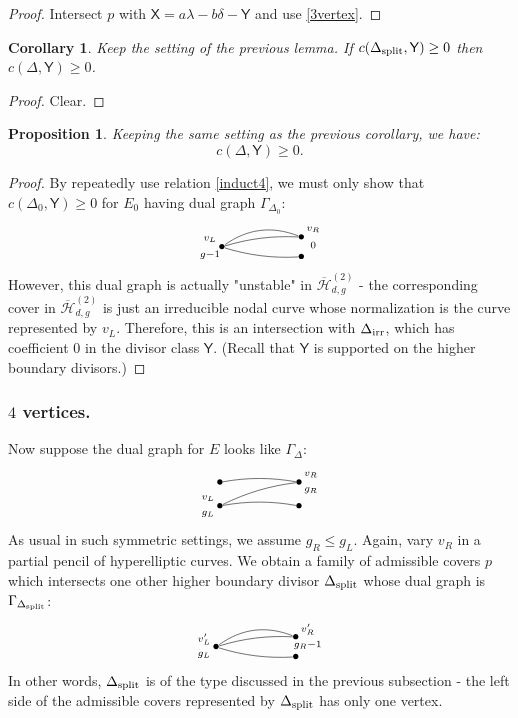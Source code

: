 \documentclass[reqno, 10 pt]{article}
\newtheorem{prop}[thm]{Proposition}
\newtheorem{cor}[thm]{Corollary}
\theoremstyle{definition}
\theoremstyle{remark}
\numberwithin{equation}{section}
\numberwithin{thm}{section}
\numberwithin{prop}{section}
\numberwithin{lem}{section}
\numberwithin{cor}{section}
\numberwithin{conj}{section}
\numberwithin{defn}{section}
\renewcommand{\H}{\mathcal H}
\newcommand{\Hdgnt}{\overline{\H}_{d,g}^{(2)}}
\newcommand{\sfY}{{\mathsf Y}}
\newcommand{\sfX}{{\mathsf X}}
\renewcommand{\H}{{\mathcal{H}}}
\newcommand {\irr}{{\rm irr}}
\newcommand {\spl}{{\rm split}}
\begin{document}
\begin{proof}
Intersect $p$ with $\sfX = a\lambda - b\delta - {\sfY}$ and use \autoref{3vertex}.
\end{proof}

\begin{cor}\label{induct4}
Keep the setting of the previous lemma.  If $ c(\Delta_{\spl}, {\sfY}) \geq 0$ then $c(\Delta ,{\sfY}) \geq 0$.
\end{cor}

\begin{proof}
Clear.
\end{proof}

\begin{prop}
Keeping the same setting as the previous corollary, we have: 
$$c(\Delta, \sfY) \geq 0.$$
\end{prop}

\begin{proof}
 By repeatedly use relation \autoref{induct4}, we must only show that $c(\Delta_0, {\sfY}) \geq 0$ for $E_0$ having dual graph $\Gamma_{\Delta_{0}}$: \[   \xygraph{
!{<0cm,0cm>;<1cm,0cm>:<0cm,1cm>::}
!{(0,-.25)}*{\bullet}="l"!{(-.3,-.45)}{\scriptstyle g-1}!{(-.3,-.05)}{\scriptstyle v_{L}}
!{(2,0) }*{\bullet}="b"!{(2.3,.2)}{\scriptstyle v_R}!{(2.3,-.2)}{\scriptstyle 0}
!{(2,-.5) }*{\bullet}="a_1"
 "l"-@/^.3cm/"b"
 "l"-@/^.1cm/"b"
"l"-@/_.1cm/"a_1"
}  \] However, this dual graph is actually "unstable" in $\Hdgnt$ - the corresponding cover in $\Hdgnt$  is just an irreducible nodal curve whose normalization is the curve represented by $v_{L}$.  Therefore, this is an intersection with $\Delta_{\irr}$, which has coefficient $0$ in the divisor class $\sfY$. (Recall that $\sfY$ is supported on the higher boundary divisors.)
\end{proof}

\subsubsection{$4$ vertices.} Now suppose the dual graph for $E$ looks like $\Gamma_{\Delta}$:\[ \xygraph{
!{<0cm,0cm>;<1cm,0cm>:<0cm,1cm>::}
!{(0,-.6)}*{\bullet}="l"!{(-.3,-.8)}{\scriptstyle g_L}!{(-.3,-.4)}{\scriptstyle v_{L}}
!{(0,0)}*{\bullet}="l'"
!{(2,0) }*{\bullet}="b"!{(2.3,.2)}{\scriptstyle v_R}!{(2.3,-.2)}{\scriptstyle g_R}
!{(2,-.6) }*{\bullet}="a_1"
 "l'"-@/^.1cm/"b" 
 "l"-@/^.1cm/"b"
"l"-@/^.1cm/"a_1"
}  \] As usual in such symmetric settings, we assume $g_R \leq g_L$.  Again, vary $v_R$ in a partial pencil of hyperelliptic curves.  We obtain a family of admissible covers $p$ which intersects one other higher boundary divisor $\Delta_{\spl}$ whose dual graph is $\Gamma_{\Delta_{\spl}}$:  \[   \xygraph{
!{<0cm,0cm>;<1cm,0cm>:<0cm,1cm>::}
!{(0,-.25)}*{\bullet}="l"!{(-.3,-.45)}{\scriptstyle g_L}!{(-.3,-.05)}{\scriptstyle v'_{L}}
!{(2,0) }*{\bullet}="b"!{(2.3,.2)}{\scriptstyle v'_R}!{(2.3,-.2)}{\scriptstyle g_R-1}
!{(2,-.5) }*{\bullet}="a_1"
 "l"-@/^.3cm/"b"
 "l"-@/^.1cm/"b"
"l"-@/_.1cm/"a_1"
}  \]In other words, $\Delta_{\spl}$ is of the type discussed in the previous subsection - the left side of the admissible covers represented by $\Delta_{\spl}$ has only one vertex. 
\end{document}
